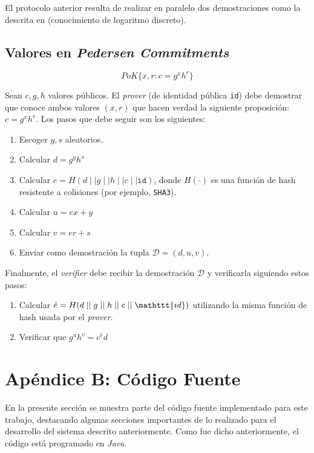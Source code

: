 El protocolo anterior resulta de realizar en paralelo dos demostraciones como la descrita en \cite{schnorr1989efficient} (conocimiento de logaritmo discreto).

\subsection{Valores en \emph{Pedersen Commitments}}

$$PoK\{x, r : c = g^x h^r\}$$

Sean $c, g, h$ valores públicos. El \emph{prover} (de identidad pública 
\texttt{id}) debe demostrar que conoce ambos valores $(x,r)$ que hacen verdad 
la siguiente proposición: $c = g^x h^r$. Los pasos que debe seguir son los 
siguientes:
\begin{enumerate}
	\item Escoger $y, s$ aleatorios.
	\item Calcular $d = g^y h^s$
	\item Calcular $e = H(d \mid\mid g \mid\mid h \mid\mid c \mid\mid \mathtt{id})$, donde $H(\cdot)$ es una función de hash resistente a colisiones (por ejemplo, \texttt{SHA3}).
	\item Calcular $u = ex + y$
	\item Calcular $v = er + s$
	\item Enviar como demostración la tupla $\mathcal{D} = (d, u, v)$.
\end{enumerate}

Finalmente, el \emph{verifier} debe recibir la demostración $\mathcal{D}$ y 
verificarla siguiendo estos pasos:
\begin{enumerate}
	\item Calcular $\hat{e} = H(d \mid\mid g \mid\mid h \mid\mid c \mid\mid \mathttt{id})$ utilizando la misma función de hash usada por el \emph{prover}.
	\item Verificar que $g^u h^v = c^\hat{e} d$
\end{enumerate}

\section{Apéndice B: Código Fuente}\label{apen-b}

En la presente sección se muestra parte del código fuente implementado para este trabajo, 
destacando algunas secciones importantes de lo realizado para el desarrollo 
del sistema descrito anteriormente. Como fue dicho anteriormente, el código está 
programado en \emph{Java}.

